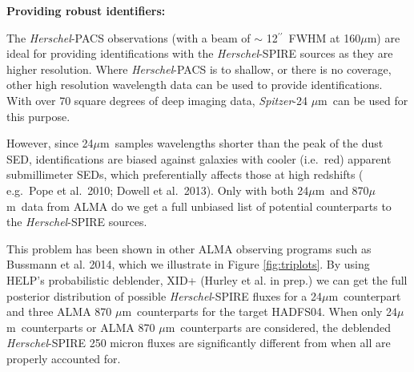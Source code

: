 \documentclass[12pt,a4paper]{article}
\newcommand{\herschel}{{\it Herschel}}
\newcommand{\spitzer}{{\it Spitzer}}
\newcommand{\ea}{et~al.}
\newcommand{\micron}{$\mu$m}
\newcommand{\arcsec}{$^{\prime\prime}$}
\begin{document}
%


{\bf Providing robust identifiers:}
%

The \herschel-PACS observations (with a beam of $\sim$ 12\arcsec\ FWHM at 160\micron) are ideal for providing identifications with the  \herschel-SPIRE sources as they are higher resolution. Where \herschel-PACS is to shallow, or there is no coverage, other high resolution wavelength data can be used to provide identifications. With over 70 square degrees of deep imaging data, \spitzer-24 \micron\ can be used for this purpose. 

However, since 24\micron\ samples wavelengths shorter than the peak of the dust SED, identifications are biased against galaxies with cooler (i.e.\ red) apparent submillimeter SEDs, which preferentially affects those at
high redshifts ( e.g.\ Pope et al.\ 2010; Dowell et al.\ 2013). Only with both 24\micron\ and 870\micron\ data from ALMA do we get a full unbiased list of potential counterparts to the \herschel-SPIRE sources.

This problem has been shown in other ALMA observing programs such as Bussmann et al. 2014, which we illustrate in Figure \ref{fig:triplots}. By using HELP's probabilistic deblender, XID+ (Hurley et al. in prep.) we can get the full posterior distribution of possible \herschel-SPIRE fluxes for a 24\micron\ counterpart and three ALMA 870 \micron\ counterparts for the target HADFS04. When only 24\micron\ counterparts or ALMA 870 \micron\ counterparts are considered, the deblended \herschel-SPIRE 250 micron fluxes are significantly different from when all are properly accounted for.
\end{document}
